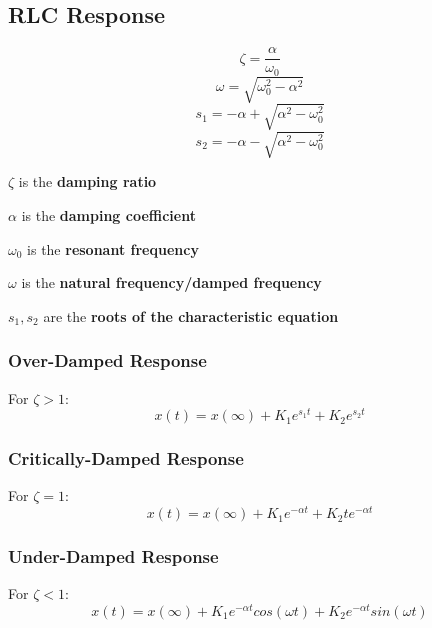 \documentclass{article}
\begin{document}
\subsection*{RLC Response}
\begin{equation}
\zeta = \frac{\alpha}{\omega_0}
\end{equation}
\begin{equation}
\omega = \sqrt{\omega_0^2-\alpha^2}
\end{equation}
\begin{equation}
    s_1 = -\alpha + \sqrt{\alpha^2 - \omega_0^2}
\end{equation}
\begin{equation}
    s_2 = -\alpha - \sqrt{\alpha^2 - \omega_0^2} 
\end{equation}
\begin{center}
$\zeta$ is the \textbf{damping ratio}

$\alpha$ is the \textbf{damping coefficient}

$\omega_0$ is the \textbf{resonant frequency} 

$\omega$ is the \textbf{natural frequency/damped frequency} 

$s_1,s_2$ are the \textbf{roots of the characteristic equation} 
\end{center}
\subsubsection*{Over-Damped Response}
For $\zeta > 1$:
\begin{equation}
    x(t) = x(\infty) + K_1e^{s_1 t}+K_2e^{s_2 t}
\end{equation}
\subsubsection*{Critically-Damped Response}
For $\zeta = 1$:
\begin{equation}
     x(t) = x(\infty) + K_1e^{-\alpha t}+K_2te^{-\alpha t}
\end{equation}
\subsubsection*{Under-Damped Response}
For $\zeta < 1$:
\begin{equation}
    x(t) = x(\infty) + K_1e^{-\alpha t}cos(\omega t)+K_2e^{-\alpha t}sin(\omega t)
\end{equation}
\newpage
\end{document}

